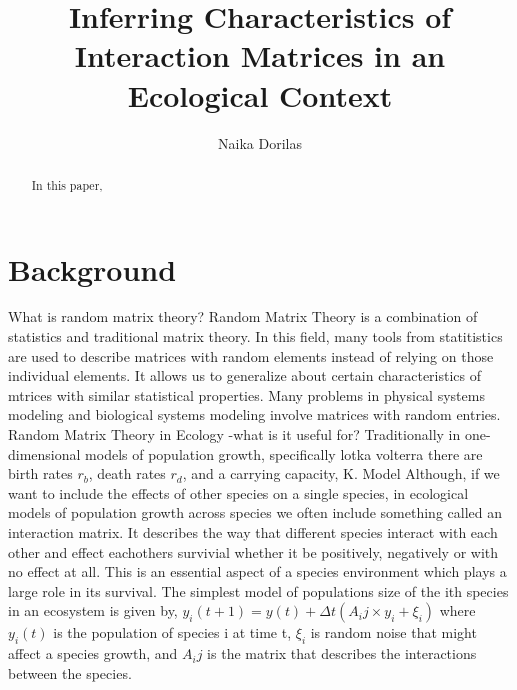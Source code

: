 \documentclass{article}
\begin{document}
\title{Inferring Characteristics of Interaction Matrices in an Ecological Context{}}
\author{Naika Dorilas}

\maketitle

\begin{abstract}
In this paper, 
\end{abstract}

\section{Background}
What is random matrix theory?\hfill\break
Random Matrix Theory is a combination of statistics and traditional matrix theory. In this field, many tools from statitistics are used to describe matrices with random elements instead of relying on those individual elements. It allows us to generalize about certain characteristics of mtrices with similar statistical properties. Many problems in physical systems modeling and biological systems modeling involve matrices with random entries. \hfill\break
Random Matrix Theory in Ecology\hfill\break
-what is it useful for?\hfill\break
Traditionally in one-dimensional models of population growth, specifically lotka volterra there are birth rates $r_b$, death rates $r_d$, and a carrying capacity, K.  \hfill\break
\hfill\break Model \hfill\break \hfill\break
Although, if we want to include the effects of other species on a single species, in ecological models of population growth across species we often include something called an interaction matrix. It describes the way that different species interact with each other and effect eachothers survivial whether it be positively, negatively or with no effect at all. This is an essential aspect of a species environment which plays a large role in its survival. The simplest model of populations size of the ith species in an ecosystem is given by,\hfill\break
\hfill\break 
$y_i(t+1)=y(t) + \Delta t(A_ij\times y_i +\xi_i)$
\hfill\break
where $y_i(t)$ is the population of species i at time t, $\xi_i$ is random noise that might affect a species growth, and $A_ij$ is the matrix that describes the interactions between the species.
\end{document}
